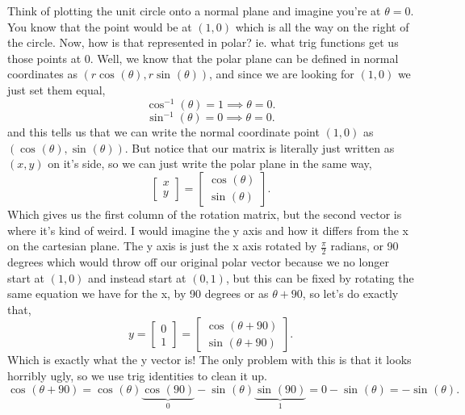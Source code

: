 \documentclass{report}
\begin{document}
Think of plotting the unit circle onto a normal plane and imagine you're at $ \theta=0 $. You know that the point would be at $ \left( 1,0 \right)  $ which is all the way on the right of the circle. Now, how is that represented in polar? ie. what trig functions get us those points at 0. Well, we know that the polar plane can be defined in normal coordinates as $ \left( r \cos^{  } \left( \theta \right) , r \sin^{  } \left( \theta \right)  \right)  $, and since we are looking for $ \left( 1,0 \right)  $ we just set them equal,
\[
\cos^{ -1 } \left( \theta \right) =1 \implies \theta = 0 
.\] 
\[
\sin^{ -1 } \left( \theta \right) = 0 \implies \theta = 0
.\] 
and this tells us that we can write the normal coordinate point $ \left( 1,0 \right)  $ as $ \left( \cos^{  } \left( \theta \right) ,\sin^{  } \left( \theta \right)  \right)  $. But notice that our matrix is literally just written as $ \left( x,y \right)  $ on it's side, so we can just write the polar plane in the same way,
\[
\begin{bmatrix} x \\ y \end{bmatrix} = \begin{bmatrix} \cos^{  } \left( \theta \right) \\ \sin^{  } \left( \theta \right)  \end{bmatrix} 
.\] 
Which gives us the first column of the rotation matrix, but the second vector is where it's kind of weird. I would imagine the y axis and how it differs from the x on the cartesian plane. The y axis is just the x axis rotated by $ \frac{ \pi }{ 2 } $ radians, or 90 degrees which would throw off our original polar vector because we no longer start at $ \left( 1,0 \right)  $ and instead start at $ \left( 0,1 \right)  $, but this can be fixed by rotating the same equation we have for the x, by 90 degrees or as $ \theta + 90 $, so let's do exactly that,
\[
y=\begin{bmatrix} 0 \\ 1 \end{bmatrix} = \begin{bmatrix} \cos^{  } \left( \theta + 90 \right) \\ \sin^{  } \left( \theta + 90 \right)  \end{bmatrix}
.\] 
Which is exactly what the y vector is! The only problem with this is that it looks horribly ugly, so we use trig identities to clean it up. 
\[
\cos^{  } \left( \theta + 90 \right) = \cos^{  } \left( \theta \right) \underbrace{ \cos^{  } \left( 90 \right) }_{ 0 }  - \sin^{  } \left( \theta \right) \underbrace{ \sin^{  } \left( 90 \right) }_{ 1 }  = 0 - \sin^{  } \left( \theta \right) = -\sin^{  } \left( \theta \right)
.\] 
\end{document}
